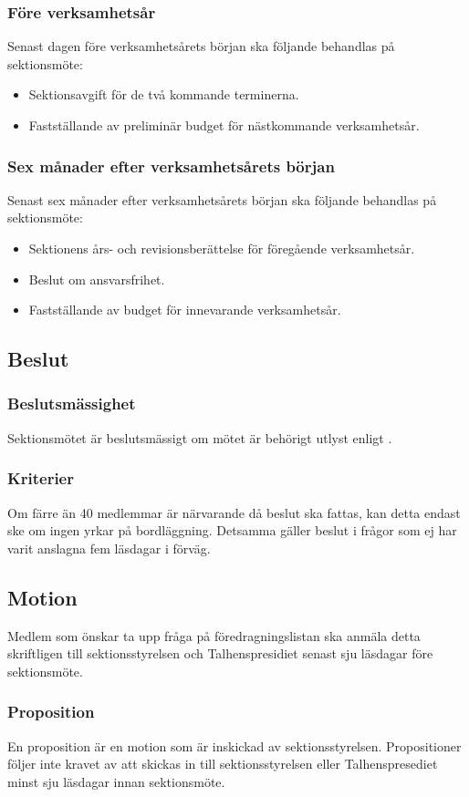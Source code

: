\subsubsection{Före verksamhetsår}
Senast dagen före verksamhetsårets början ska följande behandlas på sektionsmöte:
\begin{itemize}
\item Sektionsavgift för de två kommande terminerna.
\item Fastställande av preliminär budget för nästkommande verksamhetsår.
\end{itemize}
\subsubsection{Sex månader efter verksamhetsårets början}
Senast sex månader efter verksamhetsårets början ska följande behandlas på sektionsmöte:
\begin{itemize}
\item Sektionens års- och revisionsberättelse för föregående verksamhetsår.
\item Beslut om ansvarsfrihet.
\item Fastställande av budget för innevarande verksamhetsår.
\end{itemize}
\subsection{Beslut}
\subsubsection{Beslutsmässighet}
Sektionsmötet är beslutsmässigt om mötet är behörigt utlyst enligt .
\subsubsection{Kriterier}
Om färre än 40 medlemmar är närvarande då beslut ska fattas, kan detta endast ske om ingen yrkar på bordläggning. Detsamma gäller beslut i frågor som ej har varit anslagna fem läsdagar i förväg.
\subsection{Motion}
Medlem som önskar ta upp fråga på föredragningslistan ska anmäla detta skriftligen till sektionsstyrelsen och Talhenspresidiet senast sju läsdagar före sektionsmöte.
\subsubsection{Proposition}
En proposition är en motion som är inskickad av sektionsstyrelsen.
Propositioner följer inte kravet av att skickas in till sektionsstyrelsen eller Talhenspresediet minst sju läsdagar innan sektionsmöte.
